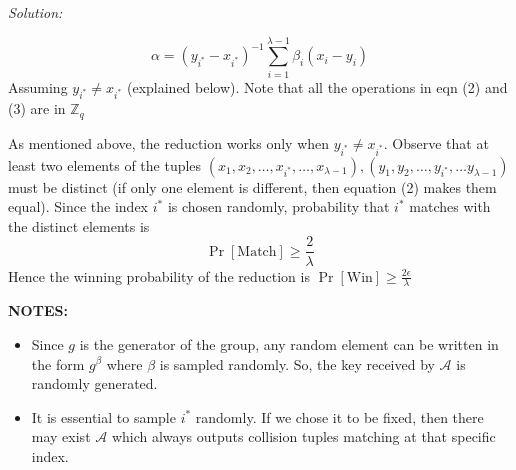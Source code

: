 \documentclass[a4paper, 11pt]{article}
\newenvironment{solution}
    {\textit{Solution:}}
    {\clearpage}
\newcommand{\Z}{\mathbb{Z}}
\newcommand{\calA}{\mathcal{A}}
\begin{document}
\begin{solution}
\begin{enumerate}[(a)]
{\begin{itemize}
            \begin{equation}
            \alpha=(y_{i^*}-x_{i^*})^{-1}\sum_{i=1}^{\lambda-1} {\beta_i (x_i-y_i)}
            \end{equation}
            Assuming $y_{i^*}\neq x_{i^*}$ (explained below). Note that all the operations in eqn (2) and (3) are in $\Z_q$
        \end{itemize}
    }

        As mentioned above, the reduction works only when $y_{i^*}\neq x_{i^*}$. 
        Observe that at least two elements of the tuples $(x_1, x_2, \dots,x_{i^*}, \dots, x_{\lambda-1}), (y_1, y_2, \dots,y_{i^*},\dots y_{\lambda-1})$ must be distinct (if only one element is different, then equation (2) makes them equal). 
        Since the index $i^*$ is chosen randomly, probability that $i^*$ matches with the distinct elements is $$\Pr[\text{Match}]\geq\frac{2}{\lambda}$$
        Hence the winning probability of the reduction is 
        $\Pr[\text{Win}]\geq\frac{2\epsilon}{\lambda}$

\textbf{NOTES:}
\begin{itemize}
    \item Since $g$ is the generator of the group, any random element can be written in the form $g^\beta$ where $\beta$ is sampled randomly. So, the key received by $\calA$ is randomly generated.
    \item It is essential to sample $i^*$ randomly. If we chose it to be fixed, then there may exist $\calA$ which always outputs collision tuples matching at that specific index.
\end{itemize}



        

\end{enumerate}
\end{solution}
\end{document}
